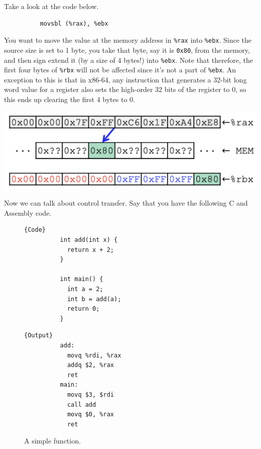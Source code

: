 \documentclass{article}
\begin{document}
      \begin{example}
        Take a look at the code below. 
        \begin{lstlisting}
          movsbl (%rax), %ebx
        \end{lstlisting}
        You want to move the value at the memory address in \texttt{\%rax} into \texttt{\%ebx}. Since the source size is set to 1 byte, you take that byte, say it is \texttt{0x80}, from the memory, and then sign extend it (by a size of 4 bytes!) into \texttt{\%ebx}. Note that therefore, the first four bytes of \texttt{\%rbx} will not be affected since it's not a part of \texttt{\%ebx}. An exception to this is that in x86-64, any instruction that generates a 32-bit long word value for a register also sets the high-order 32 bits of the register to 0, so this ends up clearing the first 4 bytes to 0. 
        \begin{center}  
          \includegraphics[scale=0.5]{img/movsbl.png}
        \end{center}
      \end{example}

      Now we can talk about control transfer. Say that you have the following C and Assembly code. 
      
      \begin{figure}[H]
        \centering 
        \noindent\begin{minipage}{.5\textwidth}
        \begin{lstlisting}[]{Code}
          int add(int x) {
            return x + 2; 
          }

          int main() {
            int a = 2; 
            int b = add(a); 
            return 0; 
          }
        \end{lstlisting}
        \end{minipage}
        \hfill
        \begin{minipage}{.49\textwidth}
        \begin{lstlisting}[]{Output}
          add: 
            movq %rdi, %rax 
            addq $2, %rax 
            ret 
          main:
            movq $3, $rdi 
            call add 
            movq $0, %rax 
            ret 
        \end{lstlisting}
        \end{minipage}
        \caption{A simple function. } 
        \label{fig:stack_example}
      \end{figure}
\end{document}
